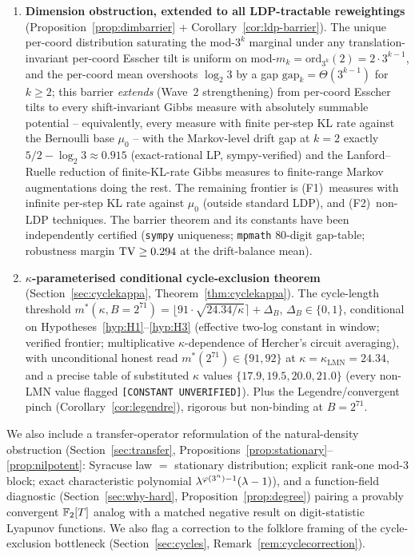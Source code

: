\documentclass[11pt]{amsart}
\theoremstyle{definition}
\theoremstyle{remark}
\begin{document}
\begin{enumerate}[label=(\roman*)]
\item \textbf{Dimension obstruction, extended to all LDP-tractable reweightings}
(Proposition~\ref{prop:dimbarrier} + Corollary~\ref{cor:ldp-barrier}). The unique per-coord
distribution saturating the mod-$3^k$ marginal under any translation-invariant per-coord Esscher
tilt is uniform on mod-$m_k=\mathrm{ord}_{3^k}(2)=2\cdot 3^{k-1}$, and the per-coord mean
overshoots $\log_2 3$ by a gap $\mathrm{gap}_k=\Theta(3^{k-1})$ for $k\ge 2$; this barrier
\emph{extends} (Wave~2 strengthening) from per-coord Esscher tilts to every shift-invariant Gibbs
measure with absolutely summable potential -- equivalently, every measure with finite per-step KL
rate against the Bernoulli base $\mu_0$ -- with the Markov-level drift gap at $k=2$ exactly
$5/2-\log_2 3\approx 0.915$ (exact-rational LP, sympy-verified) and the Lanford--Ruelle reduction
of finite-KL-rate Gibbs measures to finite-range Markov augmentations doing the rest. The
remaining frontier is (F1)~measures with infinite per-step KL rate against $\mu_0$ (outside
standard LDP), and (F2)~non-LDP techniques. The barrier theorem and its constants have been
independently certified (\texttt{sympy} uniqueness; \texttt{mpmath} $80$-digit gap-table;
robustness margin $\mathrm{TV}\ge 0.294$ at the drift-balance mean).
\item \textbf{$\kappa$-parameterised conditional cycle-exclusion theorem}
(Section~\ref{sec:cyclekappa}, Theorem~\ref{thm:cyclekappa}). The cycle-length threshold
$m^*(\kappa,B=2^{71})=\lfloor 91\cdot\sqrt{24.34/\kappa}\rceil+\Delta_B$, $\Delta_B\in\{0,1\}$,
conditional on Hypotheses~\ref{hyp:H1}--\ref{hyp:H3} (effective two-log constant in window;
verified frontier; multiplicative $\kappa$-dependence of Hercher's circuit averaging), with
unconditional honest read $m^*(2^{71})\in\{91,92\}$ at $\kappa=\kappa_{\mathrm{LMN}}=24.34$, and
a precise table of substituted $\kappa$ values $\{17.9,19.5,20.0,21.0\}$ (every non-LMN value
flagged \texttt{[CONSTANT UNVERIFIED]}). Plus the Legendre/convergent pinch
(Corollary~\ref{cor:legendre}), rigorous but non-binding at $B=2^{71}$.
\end{enumerate}
We also include a transfer-operator reformulation of the natural-density obstruction
(Section~\ref{sec:transfer}, Propositions~\ref{prop:stationary}--\ref{prop:nilpotent}: Syracuse
law $=$ stationary distribution; explicit rank-one mod-$3$ block; exact characteristic polynomial
$\lambda^{\varphi(3^n)-1}(\lambda-1)$), and a function-field diagnostic
(Section~\ref{sec:why-hard}, Proposition~\ref{prop:degree}) pairing a provably convergent
$\mathbb{F}_2[T]$ analog with a matched negative result on digit-statistic Lyapunov functions. We also
flag a correction to the folklore framing of the cycle-exclusion bottleneck
(Section~\ref{sec:cycles}, Remark~\ref{rem:cyclecorrection}).
\end{document}
